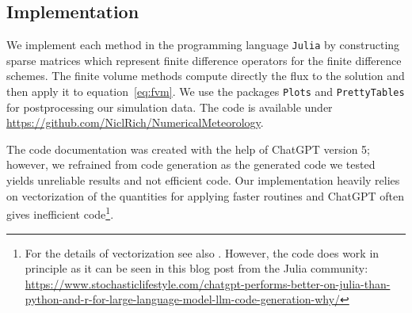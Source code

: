 \subsection{Implementation}
We implement each method in the programming language \texttt{Julia} by constructing
sparse matrices which represent finite difference operators for the finite difference schemes. The
finite volume methods compute directly the flux to the solution and then apply it to 
equation~\eqref{eq:fvm}. We use the packages \texttt{Plots} and \texttt{PrettyTables} for 
postprocessing our simulation data. The code is available under \url{https://github.com/NiclRich/NumericalMeteorology}.

The code documentation was created with the help of ChatGPT version 5; however, we refrained from
code generation as the generated code we tested yields unreliable results and not efficient code.
Our implementation heavily relies on vectorization of the quantities for applying faster routines
and ChatGPT often gives inefficient code\footnote{For the details of vectorization see also
\cite{Bezanson2017}. However, the code does work in principle as it can be seen in this blog
post from the Julia community: \url{https://www.stochasticlifestyle.com/chatgpt-performs-better-on-julia-than-python-and-r-for-large-language-model-llm-code-generation-why/}}.

